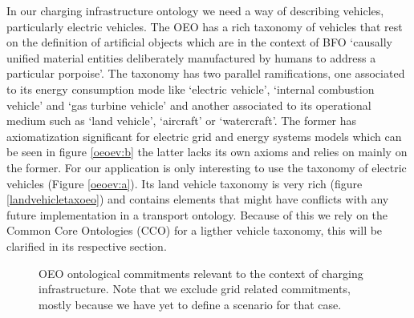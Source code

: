 In our charging infrastructure ontology we need a way of describing vehicles,
particularly electric vehicles. The OEO has a rich taxonomy of vehicles that
rest on the definition of artificial objects which are in the context of BFO
`causally unified material entities deliberately manufactured by humans to
address a particular porpoise'. The taxonomy has two parallel ramifications,
one associated to its energy consumption mode like `electric vehicle',
`internal combustion vehicle' and `gas turbine vehicle' and another associated
to its operational medium such as `land vehicle', `aircraft' or `watercraft'.
The former has axiomatization significant for electric grid and energy systems
models which can be seen in figure \ref{oeoev:b} the latter lacks its own
axioms and relies on mainly on the former. For our application is only
interesting to use the taxonomy of electric vehicles (Figure \ref{oeoev:a}).
Its land vehicle taxonomy is very rich (figure \ref{landvehicletaxoeo}) and
contains elements that might have conflicts with any future implementation in a
transport ontology. Because of this we rely on the Common Core Ontologies (CCO)
for a ligther vehicle taxonomy, this will be clarified in its respective
section.

\begin{figure}
    \centering
    \caption{OEO ontological commitments relevant to the context of charging infrastructure. Note that we exclude grid related commitments, mostly because we have yet to define a scenario for that case.}
\end{figure}

